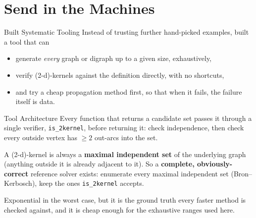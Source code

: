 \documentclass[11pt]{beamer}
\begin{document}
\section{Send in the Machines}
\begin{frame}{Built Systematic Tooling}
  Instead of trusting further hand-picked examples, built a tool that can

  \begin{itemize}
    \item generate \emph{every} graph or digraph up to a given size, exhaustively,
    \item verify (2-d)-kernels against the definition directly, with no shortcuts,
    \item and try a cheap propagation method first, so that when it fails, the
          failure itself is data.
  \end{itemize}
\end{frame}

\begin{frame}{Tool Architecture}
  Every function that returns a candidate set passes it through a single
  verifier, \texttt{is\_2kernel}, before returning it: check independence,
  then check every outside vertex has $\ge 2$ out-arcs into the set.

  \smallskip
  A (2-d)-kernel is always a \textbf{maximal independent set} of the underlying
  graph (anything outside it is already adjacent to it). So a
  \textbf{complete, obviously-correct} reference solver exists: enumerate every
  maximal independent set (Bron--Kerbosch), keep the ones \texttt{is\_2kernel}
  accepts.

  \smallskip
  Exponential in the worst case, but it is the ground truth every faster
  method is checked against, and it is cheap enough for the exhaustive ranges
  used here.
\end{frame}
\end{document}

